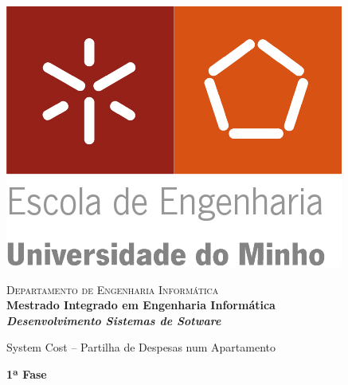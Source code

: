 \begin{titlepage}


\begin{minipage}{0.3\textwidth}
\begin{flushleft} 
\includegraphics[width=\textwidth]{logo.png}
\end{flushleft}
\end{minipage}
\begin{minipage}{0.6\textwidth}
\begin{flushright} 

\textsc{Departamento de Engenharia Informática}\\[0.1cm]
\bfseries Mestrado Integrado em Engenharia Informática \\ [0.1cm]
\bfseries \textit{Desenvolvimento Sistemas de Sotware}\\[8mm]

\end{flushright}
\end{minipage}


\vspace{3cm}


\begin{center}


\LARGE System Cost – Partilha de Despesas num Apartamento 
\vspace{3ex}


\LARGE \textbf{1ª Fase }\\[1.5cm]





\end{center}
\end{titlepage}
